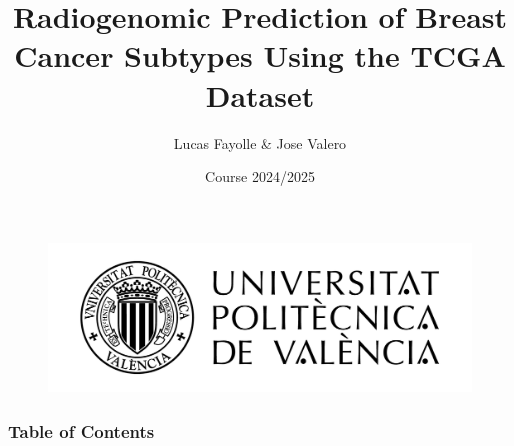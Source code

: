 \documentclass[11pt]{beamer}
\title[Project 4]{Radiogenomic Prediction of Breast Cancer Subtypes Using the TCGA Dataset}
\author[Biomedical Data Science]{\normalsize Lucas Fayolle \& Jose Valero}
\institute[BDS]{Biomedical Data Science \\ (ETSINF - UPV)}
\date[2024/2025]{Course 2024/2025}
\begin{document}

\begin{frame}
	\begin{figure}
		\includegraphics[width=0.45\linewidth]{img/upv_logo.png}
	\end{figure}
	\titlepage
\end{frame}


\begin{frame}
	\frametitle{Table of Contents}
	\tableofcontents 
\end{frame}




\end{document}
